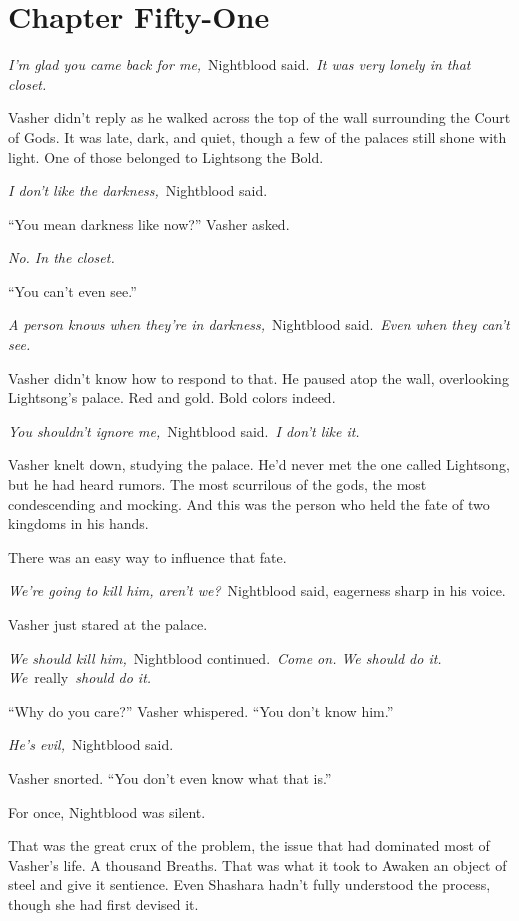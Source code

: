 \section{Chapter Fifty-One}

\textit{I’m glad you came back for me,}~Nightblood said.~\textit{It was very lonely in that closet.}

Vasher didn’t reply as he walked across the top of the wall surrounding the Court of Gods. It was late, dark, and quiet, though a few of the palaces still shone with light. One of those belonged to Lightsong the Bold.

\textit{I don’t like the darkness,}~Nightblood said.

“You mean darkness like now?” Vasher asked.

\textit{No. In the closet.}

“You can’t even see.”

\textit{A person knows when they’re in darkness,}~Nightblood said.~\textit{Even when they can’t see.}

Vasher didn’t know how to respond to that. He paused atop the wall, overlooking Lightsong’s palace. Red and gold. Bold colors indeed.

\textit{You shouldn’t ignore me,}~Nightblood said.~\textit{I don’t like it.}

Vasher knelt down, studying the palace. He’d never met the one called Lightsong, but he had heard rumors. The most scurrilous of the gods, the most condescending and mocking. And this was the person who held the fate of two kingdoms in his hands.

There was an easy way to influence that fate.

\textit{We’re going to kill him, aren’t we?}~Nightblood said, eagerness sharp in his voice.

Vasher just stared at the palace.

\textit{We should kill him,}~Nightblood continued.~\textit{Come on. We should do it. We}~really~\textit{should do it.}

“Why do you care?” Vasher whispered. “You don’t know him.”

\textit{He’s evil,}~Nightblood said.

Vasher snorted. “You don’t even know what that is.”

For once, Nightblood was silent.

That was the great crux of the problem, the issue that had dominated most of Vasher’s life. A thousand Breaths. That was what it took to Awaken an object of steel and give it sentience. Even Shashara hadn’t fully understood the process, though she had first devised it.


